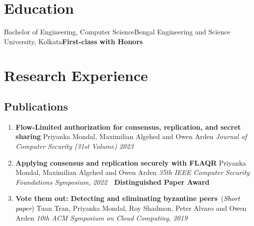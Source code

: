 \documentclass[9pt,a4paper]{moderncv}
\begin{document}
\makecvtitle
\vspace{-1cm}
\section{Education}
\vspace{0.2cm}
{Bachelor of Engineering, Computer Science}{Bengal Engineering and Science University, Kolkata}{}{\textbf{First-class with Honors}}{}
\section{Research Experience}
\vspace{0.1cm}
\hspace{-0.1cm}
\hspace{-0.1cm}
\subsection{Publications}
\begin{enumerate}
\item{\textbf{Flow-Limited authorization for consensus, replication, and secret sharing}}
\newline Priyanka Mondal, Maximilian Algehed and Owen Arden \newline
\textit{Journal of Computer Security (31st Volume) 2023~~}
\item{\textbf{Applying consensus and replication securely with FLAQR}}
\newline Priyanka Mondal, Maximilian Algehed and Owen Arden \newline
\textit{35th IEEE Computer Security Foundations Symposium, 2022~~}{\textbf{\textsf{\textcolor{bittersweet}{Distinguished Paper Award}}}}
\item{\textbf{Vote them out: Detecting and eliminating byzantine peers}}~({\textit{\textsf{\textcolor{black}{Short paper}}}})
\newline Tuan Tran, Priyanka Mondal, Roy Shadmon, Peter Alvaro and Owen Arden \newline
\textit{10th ACM Symposium on Cloud Computing, 2019~~}
\end{enumerate}
\end{document}
